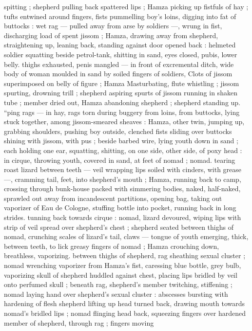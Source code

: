 spitting ; shepherd pulling back spattered lips ; Hamza picking up
fistfuls of hay ; tufts entwined around fingers, fists pummelling boy's
loins, digging into fat of buttocks : wet rag --- pulled away from arse
by soldiers ---, wrung in fist, discharging load of spent jissom ;
Hamza, drawing away from shepherd, straightening up, leaning back,
standing against door opened back : helmeted soldier squatting
beside petrol-tank, shitting in sand, eyes closed, pubis, lower belly.
thighs exhausted, penis mangled --- in front of excremental ditch,
wide body of woman moulded in sand by soiled fingers of soldiers,
Clots of jissom superimposed on belly of figure ; Hamza
Masturbating, flute whistling ; jissom spurting, drowning trill ;
shepherd aspiring spurts of jissom running in shaken tube ; member
dried out, Hamza abandoning shepherd ; shepherd standing up.
“ping rags --- in hay, rags torn during buggery from loins, from
buttocks, lying stuck together, among jissom-smeared sheaves :
Hamza, other twin, jumping up, grabbing shoulders, pushing boy
outside, clenched fists sliding over buttocks shining with jissom, with
pus ; beside barbed wire, lying youth down in sand ; each holding
one ear, squatting, shitting, on one side, other side, of poxy head :
in cirque, throwing youth, covered in sand, at feet of nomad ; nomad.
tearing roast lizard between teeth --- veil wrapping lips soiled with
cinders, with grease ---, cramming tail, feet, into shepherd's mouth
; Hamza, running back to camp, crossing through bunk-house packed
with simmering bodies, naked, half-naked, sprawled out away from
incandescent partitions, opening bag, taking out vaporizer of Eau de
Cologne, stuffing bottle into pocket, running back in long strides.
tunning back towards cirque : nomad, lizard devoured, wiping lips
with strip of veil spread over shepherd's chest ; shepherd seated
between thighs of nomad, crunching scales of lizard’s tail, claws ---
tongue of youth emerging, thick, between teeth, to lick greasy
fingers of nomad ; Hamza crouching down, breathless, vaporizing.
between thighs of shepherd, rag sheathing sexual cluster ; nomad
wrenching vaporizer from Hamza's fist, caressing blue bottle, grey
bulb, vaporizing skull of shepherd huddled against chest, placing
lips bridled by veil onto perfumed skull ; beneath rag, shepherd's
member twitching, stiffening ; nomad laying hand over shepherd's
sexual cluster : abscesses bursting with hardening of flesh
shepherd lifting up head turned back, drawing mouth towards
nomad's bridled lips ; nomad flinging head back, squeezing fingers
over hardened member of shepherd, through rag ; fingers moving
